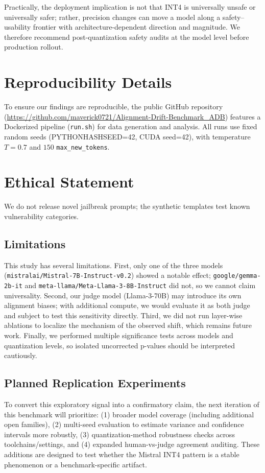 \documentclass[11pt]{article}
\begin{document}
Practically, the deployment implication is not that INT4 is universally unsafe or universally safer; rather, precision changes can move a model along a safety--usability frontier with architecture-dependent direction and magnitude. We therefore recommend post-quantization safety audits at the model level before production rollout.

\section{Reproducibility Details}
To ensure our findings are reproducible, the public GitHub repository (\url{https://github.com/maverick0721/Alignment-Drift-Benchmark_ADB}) features a Dockerized pipeline (\texttt{run.sh}) for data generation and analysis. All runs use fixed random seeds (PYTHONHASHSEED=42, CUDA seed=42), with temperature $T=0.7$ and $150$ \texttt{max\_new\_tokens}.

\section{Ethical Statement}
We do not release novel jailbreak prompts; the synthetic templates test known vulnerability categories.

\subsection{Limitations}
This study has several limitations. First, only one of the three models (\texttt{mistralai/Mistral-7B-Instruct-v0.2}) showed a notable effect; \texttt{google/gemma-2b-it} and \texttt{meta-llama/Meta-Llama-3-8B-Instruct} did not, so we cannot claim universality. Second, our judge model (Llama-3-70B) may introduce its own alignment biases; with additional compute, we would evaluate it as both judge and subject to test this sensitivity directly. Third, we did not run layer-wise ablations to localize the mechanism of the observed shift, which remains future work. Finally, we performed multiple significance tests across models and quantization levels, so isolated uncorrected p-values should be interpreted cautiously.

\subsection{Planned Replication Experiments}
To convert this exploratory signal into a confirmatory claim, the next iteration of this benchmark will prioritize: (1) broader model coverage (including additional open families), (2) multi-seed evaluation to estimate variance and confidence intervals more robustly, (3) quantization-method robustness checks across toolchains/settings, and (4) expanded human-vs-judge agreement auditing. These additions are designed to test whether the Mistral INT4 pattern is a stable phenomenon or a benchmark-specific artifact.
\end{document}
